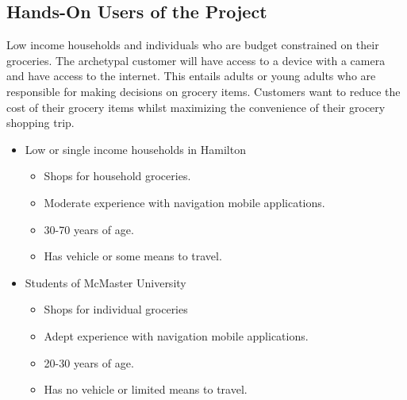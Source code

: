 \documentclass[12pt]{article}
\begin{document}
\subsection{Hands-On Users of the Project}
Low income households and individuals who are budget constrained on their groceries. The archetypal customer will have access to a device with a camera and have access to the internet. This entails adults or young adults who are responsible for making decisions on grocery items. Customers want to reduce the cost of their grocery items whilst maximizing the convenience of their grocery shopping trip. 
\begin{itemize}
  \item Low or single income households in Hamilton
  \begin{itemize}
    \item Shops for household groceries.
    \item Moderate experience with navigation mobile applications.
    \item 30-70 years of age.
    \item Has vehicle or some means to travel.
  \end{itemize}
  \item Students of McMaster University
  \begin{itemize}
    \item Shops for individual groceries
    \item Adept experience with navigation mobile applications.
    \item 20-30 years of age.
    \item Has no vehicle or limited means to travel.
  \end{itemize}
\end{itemize}
\end{document}
